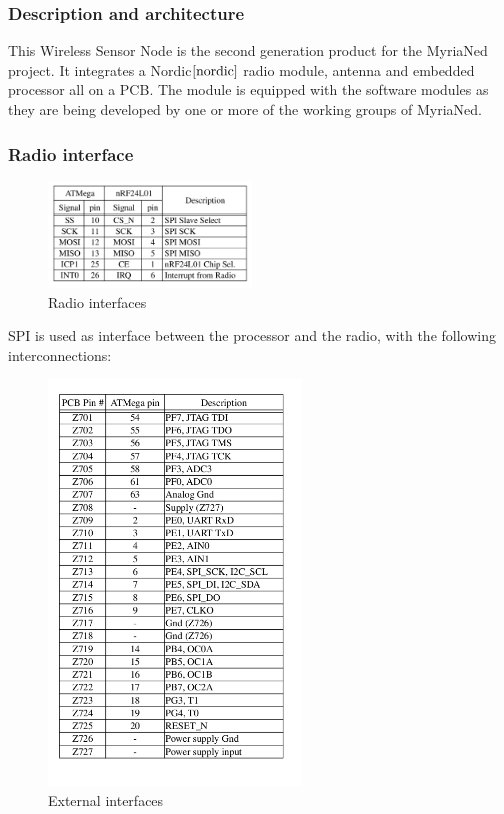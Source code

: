 \documentclass[a4paper,10pt]{report}
\begin{document}
\subsubsection{Description and architecture}
This Wireless Sensor Node is the second generation product for the MyriaNed project. It integrates a Nordic$\cite{nordic}$ radio module, antenna and embedded processor all on a PCB. The module is equipped with the software modules as they are being developed by one or more of the working groups of MyriaNed.
\subsubsection{Radio interface}
\begin{figure}
\vspace{-30pt}
  \begin{center}
    \includegraphics[width=0.48\textwidth]{table1}
  \end{center}
  \caption{Radio interfaces}
  \label{table1}
\end{figure}
SPI is used as interface between the processor and the radio, with the following interconnections:
\begin{figure}
 \centering
    \includegraphics[width=0.6\textwidth]{table2}
  \caption{External interfaces}
  \label{table2}
\end{figure}
\end{document}
